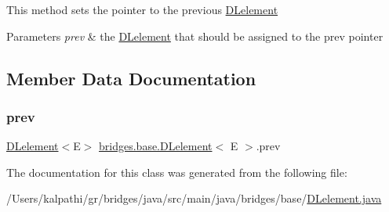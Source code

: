 This method sets the pointer to the previous \mbox{\hyperlink{classbridges_1_1base_1_1_d_lelement}{D\+Lelement}}


\begin{DoxyParams}{Parameters}
{\em prev} & the \mbox{\hyperlink{classbridges_1_1base_1_1_d_lelement}{D\+Lelement}} that should be assigned to the prev pointer \\
\hline
\end{DoxyParams}


\subsection{Member Data Documentation}
\mbox{\label{classbridges_1_1base_1_1_d_lelement_a6eba4876f820b75ac6bde01d7dea9da7}} 
\subsubsection{\texorpdfstring{prev}{prev}}
{\footnotesize\ttfamily \mbox{\hyperlink{classbridges_1_1base_1_1_d_lelement}{D\+Lelement}}$<$E$>$ \mbox{\hyperlink{classbridges_1_1base_1_1_d_lelement}{bridges.\+base.\+D\+Lelement}}$<$ E $>$.prev\hspace{0.3cm}{\ttfamily [protected]}}



The documentation for this class was generated from the following file\+:\begin{DoxyCompactItemize}
\item 
/\+Users/kalpathi/gr/bridges/java/src/main/java/bridges/base/\mbox{\hyperlink{_d_lelement_8java}{D\+Lelement.\+java}}\end{DoxyCompactItemize}
